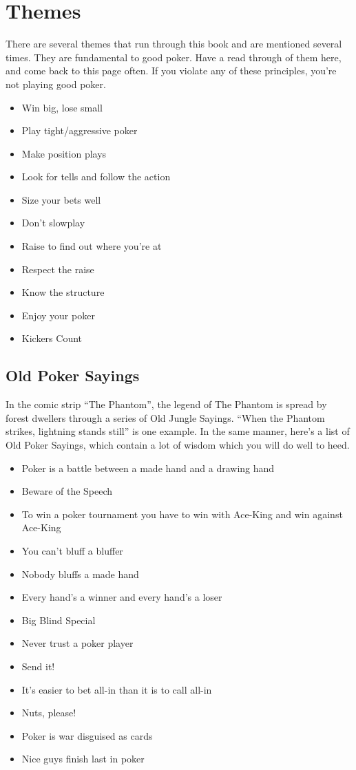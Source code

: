 \chapter{Themes}


There are several themes that run through this book and are mentioned
several times. They are fundamental to good poker. Have a read through
of them here, and come back to this page often. If you violate any of
these principles, you're not playing good poker.

\begin{itemize}
  \item Win big, lose small
  \item Play tight/aggressive poker
  \item Make position plays
  \item Look for tells and follow the action
  \item Size your bets well
  \item Don't slowplay
  \item Raise to find out where you're at
  \item Respect the raise
  \item Know the structure
  \item Enjoy your poker
  \item Kickers Count
\end{itemize}

\section{Old Poker Sayings}

In the comic strip ``The Phantom'', the legend of The Phantom is
spread by forest dwellers through a series of Old Jungle Sayings.
``When the Phantom strikes, lightning stands still'' is one example.
In the same manner, here's a list of Old Poker Sayings, which contain
a lot of wisdom which you will do well to heed.

\begin{itemize}
  \item Poker is a battle between a made hand and a drawing hand
  \item Beware of the Speech
  \item To win a poker tournament you have to win with Ace-King and win
    against Ace-King
  \item You can't bluff a bluffer
  \item Nobody bluffs a made hand
  \item Every hand's a winner and every hand's a loser
  \item Big Blind Special
  \item Never trust a poker player
  \item Send it!
  \item It's easier to bet all-in than it is to call all-in
  \item Nuts, please!
  \item Poker is war disguised as cards
  \item Nice guys finish last in poker
\end{itemize}

